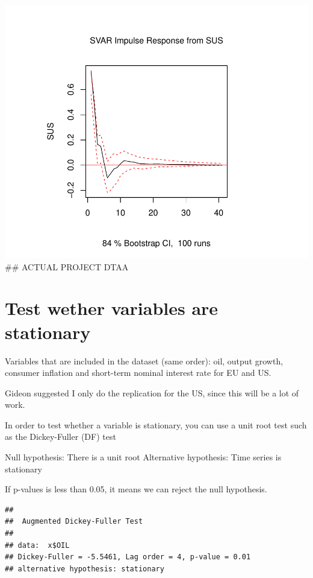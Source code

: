 \documentclass[11pt,preprint, authoryear]{elsarticle}
\numberwithin{equation}{section}
\numberwithin{figure}{section}
\numberwithin{table}{section}
\begin{document}
\includegraphics{replication_files/figure-latex/unnamed-chunk-2-1.pdf}
\#\# ACTUAL PROJECT DTAA

\hypertarget{test-wether-variables-are-stationary}{%
\section{\texorpdfstring{Test wether variables are stationary
\label{stationary}}{Test wether variables are stationary }}\label{test-wether-variables-are-stationary}}

Variables that are included in the dataset (same order): oil, output
growth, consumer inflation and short-term nominal interest rate for EU
and US.

Gideon suggested I only do the replication for the US, since this will
be a lot of work.

In order to test whether a variable is stationary, you can use a unit
root test such as the Dickey-Fuller (DF) test

Null hypothesis: There is a unit root Alternative hypothesis: Time
series is stationary

If p-values is less than 0.05, it means we can reject the null
hypothesis.

\begin{verbatim}
## 
##  Augmented Dickey-Fuller Test
## 
## data:  x$OIL
## Dickey-Fuller = -5.5461, Lag order = 4, p-value = 0.01
## alternative hypothesis: stationary
\end{verbatim}
\end{document}
